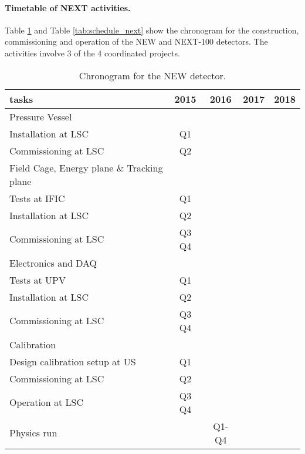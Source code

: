 \paragraph{Timetable of NEXT activities.}
Table \ref{tab:schedule_new} and Table \ref{tab:schedule_next} show the chronogram for the construction, commissioning and operation of the NEW and NEXT-100 detectors. The activities involve 3 of the 4 coordinated projects. 

\begin{table}[h!]
\begin{center}
\begin{tabular}{| l | c | c | c | c |}
\hline
tasks & 2015 & 2016 & 2017 & 2018 \\
\hline
Pressure Vessel & & & &   \\
\hline
Installation at LSC & Q1 & & & \\
Commissioning at LSC & Q2 & & & \\
\hline
Field Cage, Energy plane \& Tracking plane & & & &   \\
\hline
Tests at IFIC & Q1 & & & \\
Installation at LSC & Q2 & & & \\
Commissioning at LSC & Q3 Q4 & & & \\
\hline
Electronics and DAQ & & & &   \\
\hline
Tests at UPV & Q1 & & & \\
Installation at LSC & Q2 & & & \\
Commissioning at LSC & Q3 Q4 & & & \\
\hline
Calibration & & & &   \\
\hline
Design calibration setup at US & Q1 & & & \\
Commissioning at LSC & Q2 & & & \\
Operation at LSC & Q3 Q4 & & & \\
\hline
Physics run & & Q1-Q4& &   \\
\hline
\hline
\end{tabular}
\caption{Chronogram for the NEW detector.}
\label{tab:schedule_new}
\end{center}
\end{table} 

